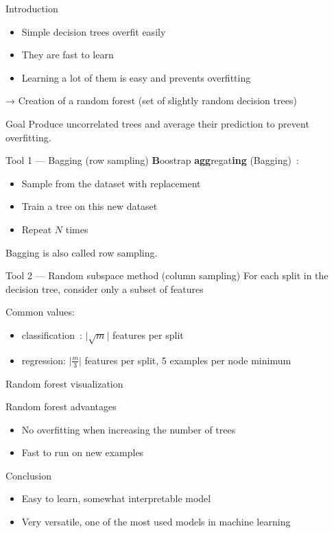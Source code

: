 \begin{frame}{Introduction}
  \begin{itemize}
  \item Simple decision trees overfit easily
  \item They are fast to learn
  \item Learning a lot of them is easy and prevents overfitting
  \end{itemize}
  → Creation of a random forest (set of slightly random decision trees)
\end{frame}

\begin{frame}{Goal}
  Produce uncorrelated trees and average their prediction to prevent overfitting.
\end{frame}

\begin{frame}{Tool 1 — Bagging (row sampling)}
  \textbf{B}oostrap \textbf{agg}regat\textbf{ing} (Bagging) :
  \begin{itemize}
  \item Sample from the dataset with replacement
  \item Train a tree on this new dataset
  \item Repeat $N$ times
  \end{itemize}
  Bagging is also called row sampling.
\end{frame}

\begin{frame}{Tool 2 — Random subspace method (column sampling)}
  For each split in the decision tree, consider only a subset of features

  Common values:
    \begin{itemize}
    \item classification : $\lvert\sqrt m\rvert$ features per split
    \item regression: $\lvert\frac{m}{3}\rvert$ features per split, 5
      examples per node minimum
    \end{itemize}
\end{frame}

\begin{frame}{Random forest visualization}
\end{frame}

\begin{frame}{Random forest advantages}
  \begin{itemize}
  \item No overfitting when increasing the number of trees
  \item Fast to run on new examples
  \end{itemize}
\end{frame}

\begin{frame}{Conclusion}
  \begin{itemize}
  \item Easy to learn, somewhat interpretable model
  \item Very versatile, one of the most used models in machine learning
  \end{itemize}
\end{frame}
